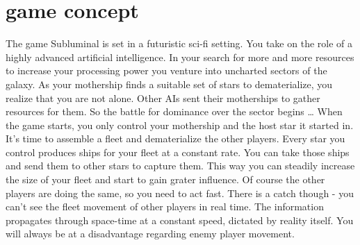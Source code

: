 \chapter*{game concept}
The game Subluminal is set in a futuristic sci-fi setting. You take on the role of a highly advanced artificial intelligence. In your search for more and more resources to increase your processing power you venture into uncharted sectors of the galaxy. As your mothership finds a suitable set of stars to dematerialize, you realize that you are not alone. Other AIs sent their motherships to gather resources for them. So the battle for dominance over the sector begins \ldots
\newline\newline
When the game starts, you only control your mothership and the host star it started in. It's time to assemble a fleet and dematerialize the other players. Every star you control produces ships for your fleet at a constant rate. You can take those ships and send them to other stars to capture them. This way you can steadily increase the size of your fleet and start to gain grater influence. Of course the other players are doing the same, so you need to act fast. There is a catch though - you can't see the fleet movement of other players in real time. The information propagates through space-time at a constant speed, dictated by reality itself. You will always be at a disadvantage regarding enemy player movement. 